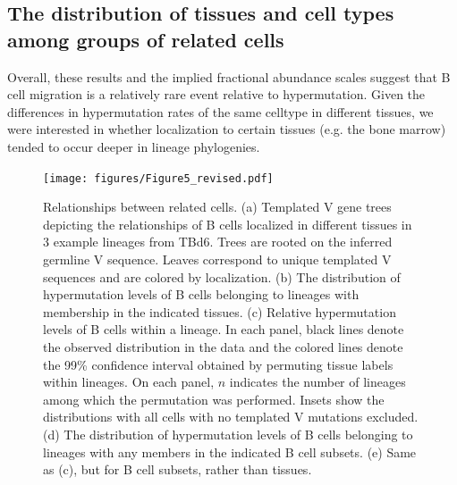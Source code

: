 
\subsection{The distribution of tissues and cell types among groups of related cells}
\noindent Overall, these results and the implied fractional abundance scales suggest that B cell migration is a relatively rare event relative to hypermutation. Given the differences in hypermutation rates of the same celltype in different tissues, we were interested in whether localization to certain tissues (e.g. the bone marrow) tended to occur deeper in lineage phylogenies. \begin{figure}
    \centering
    \texttt{[image: figures/Figure5\_revised.pdf]}
    \caption{Relationships between related cells. (a) Templated V gene trees depicting the relationships of B cells localized in different tissues in 3 example lineages from TBd6. Trees are rooted on the inferred germline V sequence. Leaves correspond to unique templated V sequences and are colored by localization. (b) The distribution of hypermutation levels of B cells belonging to lineages with membership in the indicated tissues. (c) Relative hypermutation levels of B cells within a lineage. In each panel, black lines denote the observed distribution in the data and the colored lines denote the 99\% confidence interval obtained by permuting tissue labels within lineages. On each panel, $n$ indicates the number of lineages among which the permutation was performed. Insets show the distributions with all cells with no templated V mutations excluded.  (d) The distribution of hypermutation levels of B cells belonging to lineages with any members in the indicated B cell subsets. (e) Same as (c), but for B cell subsets, rather than tissues. }

\label{fig:phylogenetic-relationships}
    
\end{figure}

